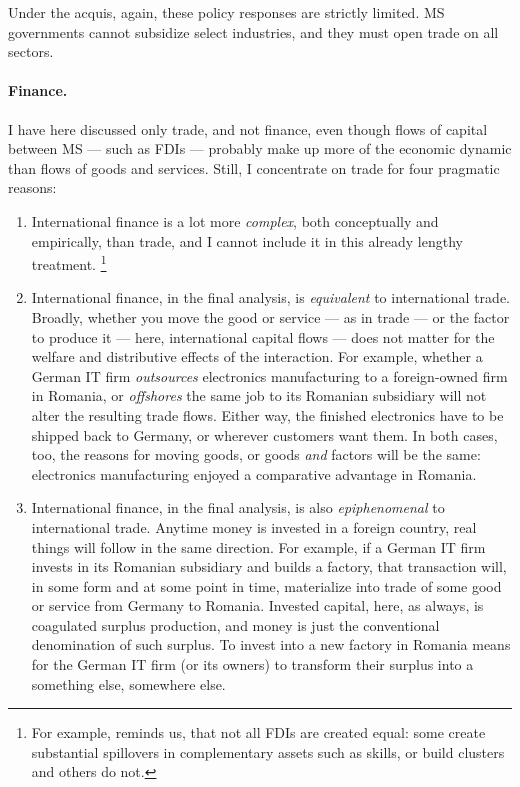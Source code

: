Under the acquis, again, these policy responses are strictly limited.
\gls{MS} governments cannot subsidize select industries, and they must open trade on all sectors.

\paragraph{Finance.}
I have here discussed only trade, and not finance, even though flows of capital between \gls{MS} --- such as \glspl{FDI} --- probably make up more of the economic dynamic than flows of goods and services.
Still, I concentrate on trade for four pragmatic reasons:
\begin{enumerate}
	\item International finance is a lot more \emph{complex}, both conceptually and empirically, than trade, and I cannot include it in this already lengthy treatment.
	\footnote{
		For example, \cite{Narula2005} reminds us, that not all \glspl{FDI} are created equal:
		some create substantial spillovers in complementary assets such as skills, or build clusters and others do not.
	}
	\item International finance, in the final analysis, is \emph{equivalent} to international trade.
	Broadly, whether you move the good or service --- as in trade --- or the factor to produce it --- here, international capital flows --- does not matter for the welfare and distributive effects of the interaction.
	For example, whether a German IT firm \emph{outsources} electronics manufacturing to a foreign-owned firm in Romania, or \emph{offshores} the same job to its Romanian subsidiary will not alter the resulting trade flows.
	Either way, the finished electronics have to be shipped back to Germany, or wherever customers want them.
	In both cases, too, the reasons for moving goods, or goods \emph{and} factors will be the same:
	electronics manufacturing enjoyed a comparative advantage in Romania.
	\item International finance, in the final analysis, is also \emph{epiphenomenal} to international trade.
	Anytime money is invested in a foreign country, real things will follow in the same direction.
	For example, if a German IT firm invests in its Romanian subsidiary and builds a factory, that transaction will, in some form and at some point in time, materialize into trade of some good or service from Germany to Romania.
	Invested capital, here, as always, is coagulated surplus production, and money is just the conventional denomination of such surplus.
	To invest into a new factory in Romania means for the German IT firm (or its owners) to transform their surplus into a something else, somewhere else.

\end{enumerate}
